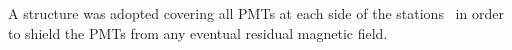 
A structure was adopted covering all PMTs at each side of the stations~\cite{2010NIMPA.615...14B} in order to shield the PMTs from any eventual residual magnetic field.


